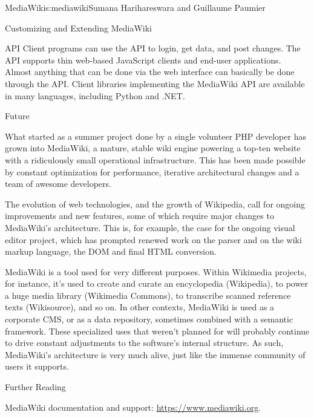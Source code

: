\begin{aosachapter}{MediaWiki}{s:mediawiki}{Sumana Harihareswara and Guillaume Paumier}
\begin{aosasect1}{Customizing and Extending MediaWiki}
\begin{aosasect2}{API}
Client programs can use the API to login, get data, and post
changes. The API supports thin web-based JavaScript clients and
end-user applications. Almost anything that can be done via the web
interface can basically be done through the API. Client libraries
implementing the MediaWiki API are available in many languages,
including Python and .NET.

\end{aosasect2}

\end{aosasect1}

\begin{aosasect1}{Future}

What started as a summer project done by a single volunteer PHP
developer has grown into MediaWiki, a mature, stable wiki engine
powering a top-ten website with a ridiculously small operational
infrastructure. This has been made possible by constant optimization
for performance, iterative architectural changes and a team of awesome
developers.

The evolution of web technologies, and the growth of Wikipedia, call
for ongoing improvements and new features, some of which require major
changes to MediaWiki's architecture. This is, for example, the case
for the ongoing visual editor project, which has prompted renewed work
on the parser and on the wiki markup language, the DOM and final HTML
conversion.

MediaWiki is a tool used for very different purposes. Within Wikimedia
projects, for instance, it's used to create and curate an encyclopedia
(Wikipedia), to power a huge media library (Wikimedia Commons), to
transcribe scanned reference texts (Wikisource), and so on. In other
contexts, MediaWiki is used as a corporate CMS, or as a data
repository, sometimes combined with a semantic framework. These
specialized uses that weren't planned for will probably continue to
drive constant adjustments to the software's internal structure. As
such, MediaWiki's architecture is very much alive, just like the
immense community of users it supports.

\end{aosasect1}

\begin{aosasect1}{Further Reading}

\begin{aosaitemize}

\item MediaWiki documentation and support:
  \url{https://www.mediawiki.org}.


\end{aosaitemize}
\end{aosasect1}
\end{aosachapter}
